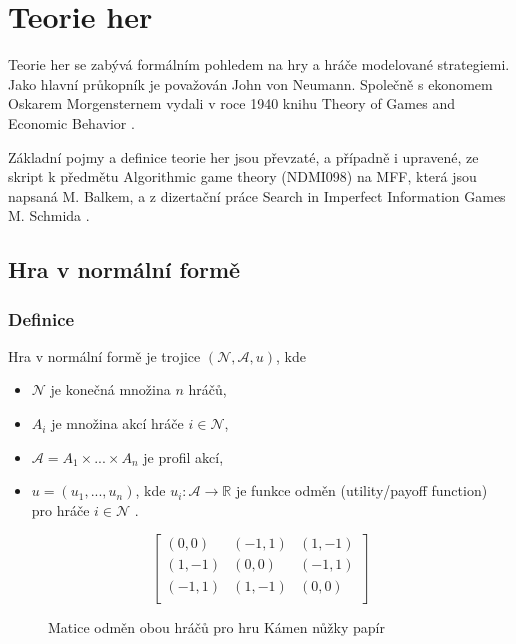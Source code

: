 \chapter{Teorie her}  

Teorie her se zabývá formálním pohledem na hry a hráče modelované strategiemi. Jako hlavní průkopník je považován John von Neumann. Společně s ekonomem Oskarem Morgensternem vydali v roce 1940 knihu Theory of Games and Economic Behavior \cite{vonneumann1947}. %

Základní pojmy a definice teorie her jsou převzaté, a případně i upravené, ze skript k předmětu Algorithmic game theory (NDMI098) \cite{Balko} na MFF, která jsou napsaná M. Balkem, a z dizertační práce Search in Imperfect Information Games M. Schmida \cite{Schmid}. 

\section{Hra v normální formě} 

\subsection{Definice}

Hra v normální formě je trojice $(\mathcal{N}, \mathcal{A}, u)$, kde 
\begin{itemize}
\item $\mathcal{N}$ je konečná množina $n$ hráčů,
\item $A_i$ je množina akcí hráče $i \in \mathcal{N}$,
\item $\mathcal{A} = A_1 \times ... \times A_n$ je profil akcí,
\item $u = (u_1, ..., u_n)$, kde $u_i: \mathcal{A} \to \mathbb{R}$ je funkce odměn (utility/payoff function) pro hráče $i \in \mathcal{N}$ \cite{Balko}.
\end{itemize}


\begin{figure}
    \centering
    \caption{Matice odměn obou hráčů pro hru Kámen nůžky papír}
    \[
    \begin{bmatrix}
        (0,0) & (-1,1) & (1,-1) \\
        (1,-1) & (0,0) & (-1,1) \\
        (-1,1) & (1,-1) & (0,0) \\
    \end{bmatrix}
    \]
    \label{fig:gamematrix}
\end{figure}


